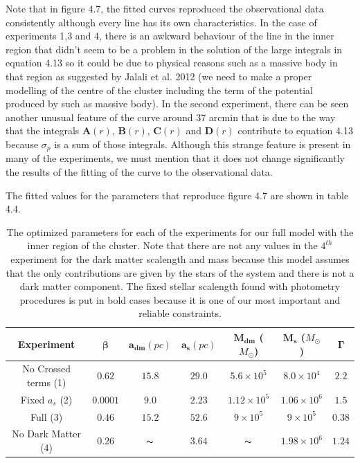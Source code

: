 Note that in figure 4.7, the fitted curves reproduced the observational data consistently although every line has its own characteristics. In the case of experiments 1,3 and 4, there is an awkward behaviour of the line in the inner region that didn't seem to be a problem in the solution of the large integrals in equation 4.13 so it could be due to physical reasons such as a massive body in that region as suggested by Jalali et al. 2012 (we need to make a proper modelling of the centre of the cluster including the term of the potential produced by such as massive body). In the second experiment, there can be seen another unusual feature of the curve around 37 arcmin that is due to the way that the integrals $\mathbf{A}(r)$, $\mathbf{B}(r)$, $\mathbf{C}(r)$ and $\mathbf{D}(r)$ contribute to equation 4.13 because $\sigma_{p}$ is a sum of those integrals. Although this strange feature is present in many of the experiments, we must mention that it does not change significantly the results of the fitting of the curve to the observational data. 

The fitted values for the parameters that reproduce figure 4.7 are shown in table 4.4.

\begin{table}[H]
\centering
\begin{tabular}{| c | c | c | c | c | c | c| }
    \hline
    \textbf{Experiment} & $\mathbf{\beta}$ & $\mathbf{a_{dm}} (pc)$ & $\mathbf{a_{s}} (pc)$ & $\mathbf{M_{dm}}$ ($M_{\odot}$) & $\mathbf{M_{s}}$ ($M_{\odot}$) & $\mathbf{\Gamma}$\\ \hline
	No Crossed terms (1) & $0.62$ &	$15.8$ &	$29.0$ &	$5.6 \times 10^{5}$ &	$8.0 \times 10^{4}$ &	$2.2$\\ \hline
	Fixed $a_s$ (2) &	$0.0001$ &	$9.0$ &	$\mathbf{2.23}$ &	$1.12 \times 10^{5}$ &	$1.06 \times 10 ^{6}$ &	$1.5$\\ \hline
	Full (3) &	$0.46$ &	$15.2$ &	$52.6$ &	$9 \times 10^{5}$ &	$9 \times 10^{5}$ &	$0.38$\\ \hline
	No Dark Matter (4) &	$0.26$ & $\thicksim$	& $3.64$  & $\thicksim$ & $  1.98 \times 10^{6}$ & 	$1.24$\\
    \hline
  \end{tabular} 
\caption[Optimized parameters for our full model with the inner region.]{The optimized parameters for each of the experiments for our full model with the inner region of the cluster. Note that there are not any values in the $4 ^{th}$ experiment for the dark matter scalength and mass because this model assumes that the only contributions are given by the stars of the system and there is not a dark matter component. The fixed stellar scalength found with photometry procedures is put in bold cases because it is one of our most important and reliable constraints.}
\end{table}

